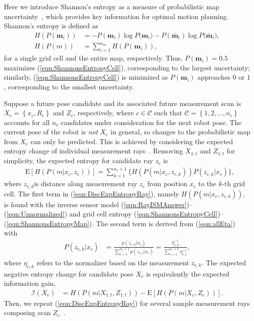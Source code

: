 \documentclass[smallextended]{svjour3}       %
\newcommand{\braces}[1]{\ensuremath{\left\{ #1 \right\}}}
\newcommand{\refeqn}[1]{(\ref{eqn:#1})}
\begin{document}
Here we introduce Shannon's entropy as a measure of probabilistic map uncertainty~\cite{StaGriBur05}, which provides key information for optimal motion planning. Shannon's entropy is defined as
\begin{align}
\label{eqn:ShannonsEntropyCell}
H(P(\mathbf{m}_i))&=-P(\mathbf{m}_i)\log{P(\mathbf{m}_i})-P(\bar{\mathbf{m}}_i)\log{P(\bar{\mathbf{m}}_i}),
\\
\label{eqn:ShannonsEntropyMap}
H(P(m))&=\sum_{i=1}^{n_m}H(P(\mathbf{m}_i)),
\end{align}
for a single grid cell and the entire map, respectively.
Thus, $P(\mathbf{m}_i)=0.5$ maximizes \refeqn{ShannonsEntropyCell}, corresponding to the largest uncertainty; similarly, \refeqn{ShannonsEntropyCell} is minimized as $P(\mathbf{m}_i)$ approaches $0$ or $1$, corresponding to the smallest uncertainty. 

Suppose a future pose candidate and its associated future measurement scan is $X_c=\braces{x_c,R_c}$ and $Z_c$, respectively, where $c\in\mathcal C$ such that $\mathcal C=\braces{1,2,...,n_c}$ accounts for all $n_c$ candidates under consideration for the next robot pose. The current pose of the robot is \emph{not} $X_c$ in general, so changes to the probabilistic map from $X_c$ can only be predicted. 
This is achieved by considering the expected entropy change of individual measurement rays~\cite{KauAiLee16,KauTakAiLee17}. Removing $X_{1:t}$ and $Z_{1:t}$ for simplicity, the expected entropy for candidate ray $z_c$ is
\begin{align}
\label{eqn:DiscExpEntropyRay}
&\text{E}[H(P(m|x_c,z_{c}))]=\sum_{k=1}^{n_{r}+1}\bigg\{H(P(m|x_c,z_{c,k}))P(z_{c,k}|x_c)\bigg\},
\end{align}
where $z_{c,k}$is distance along measurement ray $z_{c}$ from position $x_c$ to the $k$-th grid cell. The first term in \refeqn{DiscExpEntropyRay}, namely $H(P(m|x_c,z_{c,k}))$, is found with the inverse sensor model \refeqn{RayISMAnswer}--\refeqn{Unnormalized} and grid cell entropy \refeqn{ShannonsEntropyCell}--\refeqn{ShannonsEntropyMap}.
The second term is derived from \refeqn{allEta} with
\begin{align}
\label{eqn:ProbMeas}
P(z_{c,k}|x_c)&=\frac{p(z_{c,k}|x_c)}{\sum_{i=1}^{n_{r}+1}p(z_{c,i}|x_c)}=\frac{\eta_{c,k}^{-1}}{\sum_{i=1}^{n_{r}+1}\eta_{c,i}^{-1}},
\end{align}
where $\eta_{c,k}$ refers to the normalizer based on the measurement $z_{c,k}$.
The expected negative entropy change for candidate pose $X_c$ is equivalently the expected information gain,
\begin{align}
\label{eqn:expectedInfoGainRay}
\mathcal I(X_c)&=H(P(m|X_{1:t},Z_{1:t}))-\text{E}\left[H(P(m|X_c,Z_c))\right].
\end{align}
Then, we repeat \refeqn{DiscExpEntropyRay} for several sample measurement rays composing scan $Z_c$~\cite{KauAiLee16}.
\end{document}
